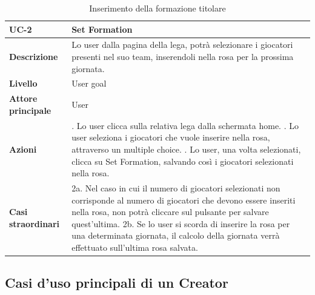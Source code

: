 \documentclass[twoside,openright,titlepage,fleqn,headinclude,12pt,a4paper,BCOR=5mm,footinclude]{scrbook}
\begin{document}
\begin{table}[H]
    \centering
    \begin{tabular}{|>{\raggedright\arraybackslash}m{2.5cm}|>{\raggedright\arraybackslash}m{10cm}|}
        \hline
        \textbf{UC-2} & \textbf{Set Formation} \\
        \hline
        \textbf{Descrizione} & Lo user dalla pagina della lega, potrà selezionare i giocatori presenti nel suo team, inserendoli nella rosa per la prossima giornata. \\
        \hline
        \textbf{Livello} & User goal \\
        \hline
        \textbf{Attore principale} & User \\
        \hline
        \textbf{Azioni} & 
        1. Lo user clicca sulla relativa lega dalla schermata home. \newline
        2. Lo user seleziona i giocatori che vuole inserire nella rosa, attraverso un multiple choice. \newline
        3. Lo user, una volta selezionati, clicca su Set Formation, salvando così i giocatori selezionati nella rosa. \\
        \hline
        \textbf{Casi straordinari} & 
        2a. Nel caso in cui il numero di giocatori selezionati non corrisponde al numero di giocatori che devono essere inseriti nella rosa, non potrà cliccare sul pulsante per salvare quest'ultima. \newline
        2b. Se lo user si scorda di inserire la rosa per una determinata giornata, il calcolo della giornata verrà effettuato sull'ultima rosa salvata. \\
        \hline
    \end{tabular}
    \caption{Inserimento della formazione titolare}
    \label{tab:set_formation}
\end{table}

\subsection{Casi d’uso principali di un Creator}
\end{document}
